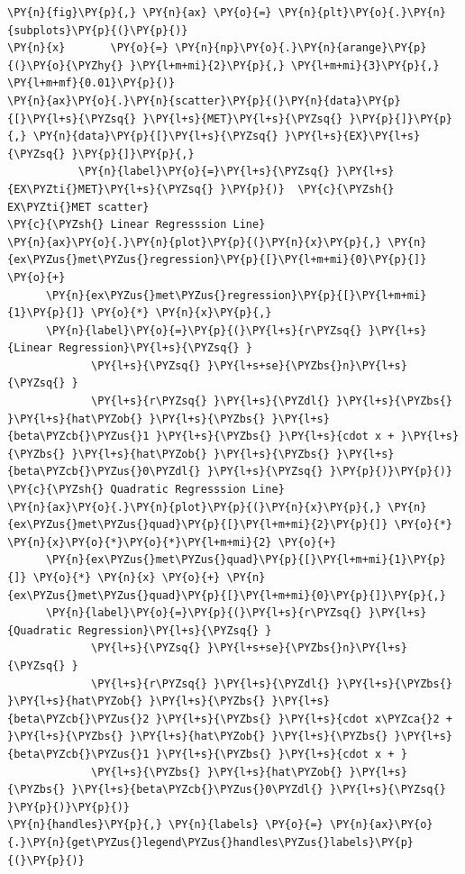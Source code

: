\documentclass[10pt]{article}\usepackage[]{graphicx}\usepackage[]{xcolor}
\begin{document}
    \begin{Verbatim}[commandchars=\\\{\}]
\PY{n}{fig}\PY{p}{,} \PY{n}{ax} \PY{o}{=} \PY{n}{plt}\PY{o}{.}\PY{n}{subplots}\PY{p}{(}\PY{p}{)}
\PY{n}{x}       \PY{o}{=} \PY{n}{np}\PY{o}{.}\PY{n}{arange}\PY{p}{(}\PY{o}{\PYZhy{} }\PY{l+m+mi}{2}\PY{p}{,} \PY{l+m+mi}{3}\PY{p}{,} \PY{l+m+mf}{0.01}\PY{p}{)}
\PY{n}{ax}\PY{o}{.}\PY{n}{scatter}\PY{p}{(}\PY{n}{data}\PY{p}{[}\PY{l+s}{\PYZsq{} }\PY{l+s}{MET}\PY{l+s}{\PYZsq{} }\PY{p}{]}\PY{p}{,} \PY{n}{data}\PY{p}{[}\PY{l+s}{\PYZsq{} }\PY{l+s}{EX}\PY{l+s}{\PYZsq{} }\PY{p}{]}\PY{p}{,}
           \PY{n}{label}\PY{o}{=}\PY{l+s}{\PYZsq{} }\PY{l+s}{EX\PYZti{}MET}\PY{l+s}{\PYZsq{} }\PY{p}{)}  \PY{c}{\PYZsh{} EX\PYZti{}MET scatter}
\PY{c}{\PYZsh{} Linear Regresssion Line}
\PY{n}{ax}\PY{o}{.}\PY{n}{plot}\PY{p}{(}\PY{n}{x}\PY{p}{,} \PY{n}{ex\PYZus{}met\PYZus{}regression}\PY{p}{[}\PY{l+m+mi}{0}\PY{p}{]} \PY{o}{+} 
      \PY{n}{ex\PYZus{}met\PYZus{}regression}\PY{p}{[}\PY{l+m+mi}{1}\PY{p}{]} \PY{o}{*} \PY{n}{x}\PY{p}{,}
      \PY{n}{label}\PY{o}{=}\PY{p}{(}\PY{l+s}{r\PYZsq{} }\PY{l+s}{Linear Regression}\PY{l+s}{\PYZsq{} }
             \PY{l+s}{\PYZsq{} }\PY{l+s+se}{\PYZbs{}n}\PY{l+s}{\PYZsq{} }
             \PY{l+s}{r\PYZsq{} }\PY{l+s}{\PYZdl{} }\PY{l+s}{\PYZbs{} }\PY{l+s}{hat\PYZob{} }\PY{l+s}{\PYZbs{} }\PY{l+s}{beta\PYZcb{}\PYZus{}1 }\PY{l+s}{\PYZbs{} }\PY{l+s}{cdot x + }\PY{l+s}{\PYZbs{} }\PY{l+s}{hat\PYZob{} }\PY{l+s}{\PYZbs{} }\PY{l+s}{beta\PYZcb{}\PYZus{}0\PYZdl{} }\PY{l+s}{\PYZsq{} }\PY{p}{)}\PY{p}{)}
\PY{c}{\PYZsh{} Quadratic Regresssion Line}
\PY{n}{ax}\PY{o}{.}\PY{n}{plot}\PY{p}{(}\PY{n}{x}\PY{p}{,} \PY{n}{ex\PYZus{}met\PYZus{}quad}\PY{p}{[}\PY{l+m+mi}{2}\PY{p}{]} \PY{o}{*} \PY{n}{x}\PY{o}{*}\PY{o}{*}\PY{l+m+mi}{2} \PY{o}{+}
      \PY{n}{ex\PYZus{}met\PYZus{}quad}\PY{p}{[}\PY{l+m+mi}{1}\PY{p}{]} \PY{o}{*} \PY{n}{x} \PY{o}{+} \PY{n}{ex\PYZus{}met\PYZus{}quad}\PY{p}{[}\PY{l+m+mi}{0}\PY{p}{]}\PY{p}{,}
      \PY{n}{label}\PY{o}{=}\PY{p}{(}\PY{l+s}{r\PYZsq{} }\PY{l+s}{Quadratic Regression}\PY{l+s}{\PYZsq{} }
             \PY{l+s}{\PYZsq{} }\PY{l+s+se}{\PYZbs{}n}\PY{l+s}{\PYZsq{} }
             \PY{l+s}{r\PYZsq{} }\PY{l+s}{\PYZdl{} }\PY{l+s}{\PYZbs{} }\PY{l+s}{hat\PYZob{} }\PY{l+s}{\PYZbs{} }\PY{l+s}{beta\PYZcb{}\PYZus{}2 }\PY{l+s}{\PYZbs{} }\PY{l+s}{cdot x\PYZca{}2 + }\PY{l+s}{\PYZbs{} }\PY{l+s}{hat\PYZob{} }\PY{l+s}{\PYZbs{} }\PY{l+s}{beta\PYZcb{}\PYZus{}1 }\PY{l+s}{\PYZbs{} }\PY{l+s}{cdot x + }
             \PY{l+s}{\PYZbs{} }\PY{l+s}{hat\PYZob{} }\PY{l+s}{\PYZbs{} }\PY{l+s}{beta\PYZcb{}\PYZus{}0\PYZdl{} }\PY{l+s}{\PYZsq{} }\PY{p}{)}\PY{p}{)}
\PY{n}{handles}\PY{p}{,} \PY{n}{labels} \PY{o}{=} \PY{n}{ax}\PY{o}{.}\PY{n}{get\PYZus{}legend\PYZus{}handles\PYZus{}labels}\PY{p}{(}\PY{p}{)}

\end{Verbatim}
\end{document}
